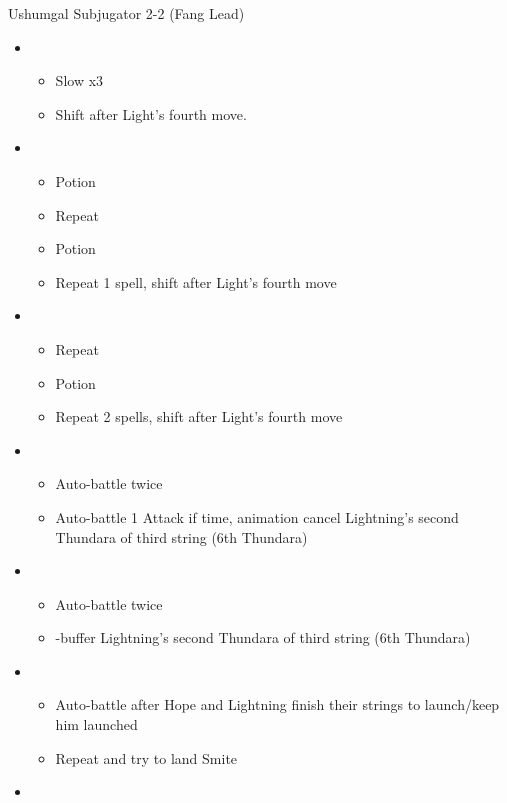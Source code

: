\begin{multicols}{2}
\begin{battle}{Ushumgal Subjugator 2-2 (Fang Lead)}
\begin{itemize}
    \item \third
    \begin{itemize}
        \item Slow x3
        \item Shift after Light's fourth move.
    \end{itemize}
    \item \fifth
    \begin{itemize}
        \item Potion
        \item Repeat
        \item Potion
        \item Repeat 1 spell, shift after Light's fourth move
    \end{itemize}
    \item \third
    \begin{itemize}
        \item Repeat
        \item Potion
        \item Repeat 2 spells, shift after Light's fourth move
    \end{itemize}
    \item \second
    \begin{itemize}
        \item Auto-battle twice
        \item Auto-battle 1 Attack if time, animation cancel Lightning's second Thundara of third string (6th Thundara)
    \end{itemize}
    \item \sixth
    \begin{itemize}
        \item Auto-battle twice
        \item \com-buffer Lightning's second Thundara of third string (6th Thundara)
    \end{itemize}
    \item \first
    \begin{itemize}
        \item Auto-battle after Hope and Lightning finish their strings to launch/keep him launched
        \item Repeat and try to land Smite
    \end{itemize}
    \item \third
    \begin{itemize}

\end{itemize}
\end{itemize}
\end{battle}
\end{multicols}
